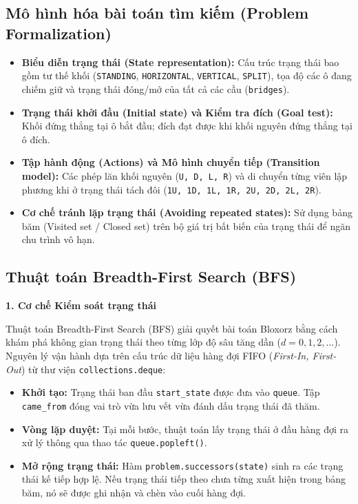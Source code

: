\documentclass[12pt,a4paper]{article}
\begin{document}
\subsection{Mô hình hóa bài toán tìm kiếm (Problem Formalization)}
\begin{itemize}
    \item \textbf{Biểu diễn trạng thái (State representation):} Cấu trúc trạng thái bao gồm tư thế khối (\texttt{STANDING}, \texttt{HORIZONTAL}, \texttt{VERTICAL}, \texttt{SPLIT}), tọa độ các ô đang chiếm giữ và trạng thái đóng/mở của tất cả các cầu (\texttt{bridges}).
    \item \textbf{Trạng thái khởi đầu (Initial state) và Kiểm tra đích (Goal test):} Khối đứng thẳng tại ô bắt đầu; đích đạt được khi khối nguyên đứng thẳng tại ô đích.
    \item \textbf{Tập hành động (Actions) và Mô hình chuyển tiếp (Transition model):} Các phép lăn khối nguyên (\texttt{U, D, L, R}) và di chuyển từng viên lập phương khi ở trạng thái tách đôi (\texttt{1U, 1D, 1L, 1R, 2U, 2D, 2L, 2R}).
    \item \textbf{Cơ chế tránh lặp trạng thái (Avoiding repeated states):} Sử dụng bảng băm (Visited set / Closed set) trên bộ giá trị bất biến của trạng thái để ngăn chu trình vô hạn.
\end{itemize}

\subsection{Thuật toán Breadth-First Search (BFS)}



\textbf{ 1. Cơ chế Kiểm soát trạng thái}


Thuật toán Breadth-First Search (BFS) giải quyết bài toán Bloxorz bằng cách khám phá không gian trạng thái theo từng lớp độ sâu tăng dần ($d = 0, 1, 2, \dots$). Nguyên lý vận hành dựa trên cấu trúc dữ liệu hàng đợi FIFO (\textit{First-In, First-Out}) từ thư viện \texttt{collections.deque}:

\begin{itemize}
    \item \textbf{Khởi tạo:} Trạng thái ban đầu \texttt{start\_state} được đưa vào \texttt{queue}. Tập \texttt{came\_from} đóng vai trò vừa lưu vết vừa đánh dấu trạng thái đã thăm.
    \item \textbf{Vòng lặp duyệt:} Tại mỗi bước, thuật toán lấy trạng thái ở đầu hàng đợi ra xử lý thông qua thao tác \texttt{queue.popleft()}.
    \item \textbf{Mở rộng trạng thái:} Hàm \texttt{problem.successors(state)} sinh ra các trạng thái kế tiếp hợp lệ. Nếu trạng thái tiếp theo chưa từng xuất hiện trong bảng băm, nó sẽ được ghi nhận và chèn vào cuối hàng đợi.
\end{itemize}
\end{document}
